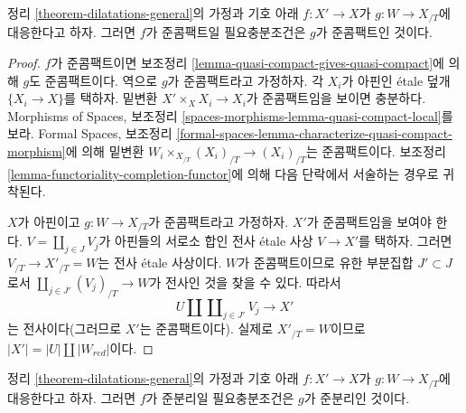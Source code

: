 \begin{lemma}
\label{lemma-output-quasi-compact}
정리 \ref{theorem-dilatations-general}의 가정과 기호 아래
$f : X' \to X$가 $g : W \to X_{/T}$에 대응한다고 하자.
그러면 $f$가 준콤팩트일 필요충분조건은 $g$가 준콤팩트인 것이다.
\end{lemma}

\begin{proof}
$f$가 준콤팩트이면 보조정리
\ref{lemma-quasi-compact-gives-quasi-compact}에 의해
$g$도 준콤팩트이다. 역으로 $g$가 준콤팩트라고 가정하자.
각 $X_i$가 아핀인 \'etale 덮개 $\{X_i \to X\}$를 택하자.
밑변환 $X' \times_X X_i \to X_i$가 준콤팩트임을 보이면 충분하다.
Morphisms of Spaces, 보조정리
\ref{spaces-morphisms-lemma-quasi-compact-local}를 보라.
Formal Spaces, 보조정리
\ref{formal-spaces-lemma-characterize-quasi-compact-morphism}에 의해
밑변환 $W_i \times_{X_{/T}} (X_i)_{/T}  \to (X_i)_{/T}$는
준콤팩트이다. 보조정리
\ref{lemma-functoriality-completion-functor}에 의해
다음 단락에서 서술하는 경우로 귀착된다.

\medskip\noindent
$X$가 아핀이고 $g : W \to X_{/T}$가 준콤팩트라고 가정하자.
$X'$가 준콤팩트임을 보여야 한다.
$V = \coprod_{j \in J} V_j$가 아핀들의 서로소 합인
전사 \'etale 사상 $V \to X'$를 택하자.
그러면 $V_{/T} \to X'_{/T} = W$는 전사 \'etale 사상이다.
$W$가 준콤팩트이므로 유한 부분집합 $J' \subset J$로서
$\coprod_{j \in J'} (V_j)_{/T} \to W$가 전사인 것을 찾을 수 있다.
따라서
$$
U \amalg \coprod\nolimits_{j \in J'} V_j \longrightarrow X'
$$
는 전사이다(그러므로 $X'$는 준콤팩트이다).
실제로 $X'_{/T} = W$이므로
$|X'| = |U| \amalg |W_{red}|$이다.
\end{proof}

\begin{lemma}
\label{lemma-output-quasi-separated}
정리 \ref{theorem-dilatations-general}의 가정과 기호 아래
$f : X' \to X$가 $g : W \to X_{/T}$에 대응한다고 하자.
그러면 $f$가 준분리일 필요충분조건은 $g$가 준분리인 것이다.
\end{lemma}

